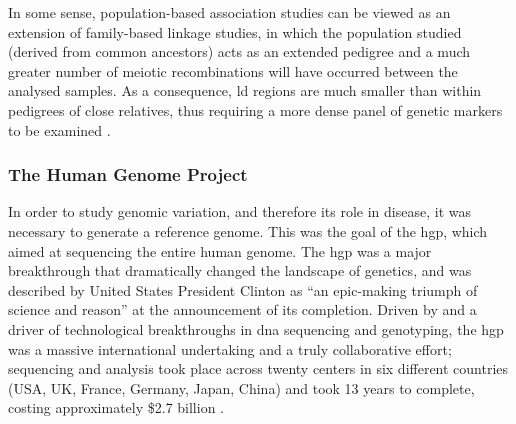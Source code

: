 In some sense, population-based association studies can be viewed as an extension of family-based linkage studies, in which the population studied (derived from common ancestors) acts as an extended pedigree and a much greater number of meiotic recombinations will have occurred between the analysed samples.
As a consequence, \gls{ld} regions are much smaller than within pedigrees of close relatives, thus requiring a more dense panel of genetic markers to be examined \cite{cordell2005genetic}.

\subsubsection{The Human Genome Project}
\label{sec:hgp}

In order to study genomic variation, and therefore its role in disease, it was necessary to generate a reference genome.
This was the goal of the \gls{hgp}, which aimed at sequencing the entire human genome.
The \gls{hgp} was 
a 
major breakthrough that dramatically changed the landscape of genetics, and was described by United States President Clinton as “an epic-making triumph of science and reason” \cite{clinton2000remarks} at the announcement of its completion.
Driven by and a driver of technological breakthroughs in \gls{dna} sequencing and genotyping, the \gls{hgp} was a massive international undertaking and a truly collaborative effort; sequencing and analysis took place across twenty centers in six different countries (USA, UK, France, Germany, Japan, China) and took 13 years to complete, costing approximately \$2.7 billion \cite{lander2011initial}.
